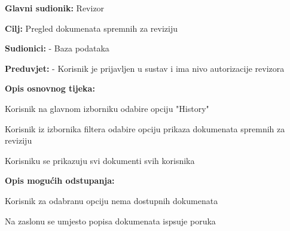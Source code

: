 					\noindent {}
						\begin{packed_item}
		
							\item \textbf{Glavni sudionik:} Revizor
							\item  \textbf{Cilj:} Pregled dokumenata spremnih za reviziju
							\item  \textbf{Sudionici:} - Baza podataka
							\item  \textbf{Preduvjet:} - Korisnik je prijavljen u sustav i ima nivo autorizacije revizora
							\item  \textbf{Opis osnovnog tijeka:}
							
							\item[] \begin{packed_enum}
								\item Korisnik na glavnom izborniku odabire opciju "History"
								\item Korisnik iz izbornika filtera odabire opciju prikaza dokumenata spremnih za reviziju
								\item Korisniku se prikazuju svi dokumenti svih korisnika
							\end{packed_enum}
							
							\item  \textbf{Opis mogućih odstupanja:}
							
							\item[] \begin{packed_item}
		
								\item[3.a]Korisnik za odabranu opciju nema dostupnih dokumenata
								\item[] \begin{packed_enum}
									\item Na zaslonu se umjesto popisa dokumenata ispsuje poruka
								\end{packed_enum}
							\end{packed_item}
						\end{packed_item}

